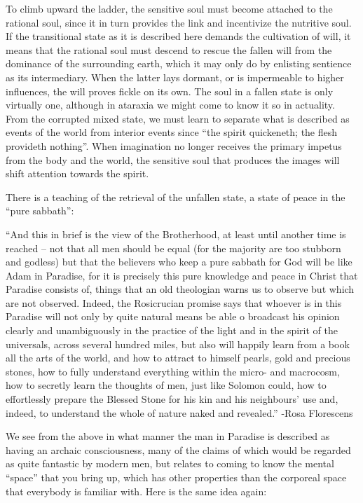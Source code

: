 \begin{footnotesize}
\begin{sffamily}
To climb upward the ladder, the sensitive soul must become attached to the rational soul, since it in turn provides the link and incentivize the nutritive soul. If the transitional state as it is described here demands the cultivation of will, it means that the rational soul must descend to rescue the fallen will from the dominance of the surrounding earth, which it may only do by enlisting sentience as its intermediary. When the latter lays dormant, or is impermeable to higher influences, the will proves fickle on its own. The soul in a fallen state is only virtually one, although in ataraxia we might come to know it so in actuality. From the corrupted mixed state, we must learn to separate what is described as events of the world from interior events since ``the spirit quickeneth; the flesh provideth nothing''. When imagination no longer receives the primary impetus from the body and the world, the sensitive soul that produces the images will shift attention towards the spirit.

There is a teaching of the retrieval of the unfallen state, a state of peace in the ``pure sabbath'':

``And this in brief is the view of the Brotherhood, at least until another time is reached -- not that all men should be equal (for the majority are too stubborn and godless) but that the believers who keep a pure sabbath for God will be like Adam in Paradise, for it is precisely this pure knowledge and peace in Christ that Paradise consists of, things that an old theologian warns us to observe but which are not observed. Indeed, the Rosicrucian promise says that whoever is in this Paradise will not only by quite natural means be able o broadcast his opinion clearly and unambiguously in the practice of the light and in the spirit of the universals, across several hundred miles, but also will happily learn from a book all the arts of the world, and how to attract to himself pearls, gold and precious stones, how to fully understand everything within the micro- and macrocosm, how to secretly learn the thoughts of men, just like Solomon could, how to effortlessly prepare the Blessed Stone for his kin and his neighbours' use and, indeed, to understand the whole of nature naked and revealed.'' -Rosa Florescens

We see from the above in what manner the man in Paradise is described as having an archaic consciousness, many of the claims of which would be regarded as quite fantastic by modern men, but relates to coming to know the mental ``space'' that you bring up, which has other properties than the corporeal space that everybody is familiar with. Here is the same idea again:


\end{sffamily}
\end{footnotesize}
